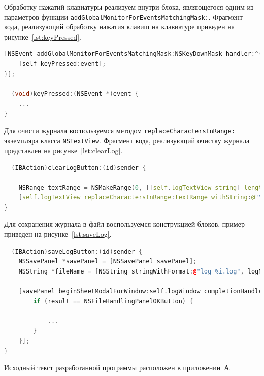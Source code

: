 Обработку нажатий клавиатуры реализуем внутри блока, являющегося одним из
параметров функции \texttt{addGlobalMonitorForEventsMatchingMask:}. Фрагмент кода,
реализующий обработку нажатия клавиш на клавиатуре приведен на рисунке~\ref{lst:keyPressed}.
\begin{lstlisting}[basicstyle=\scriptsize\ttfamily,
                   numberstyle=\scriptsize\ttfamily,
                   xleftmargin=7mm,
                   language=C++,caption={Фрагмент кода, реализующий обработку \\
                      нажатия клавиш на клавиатуре},
                   label=lst:keyPressed]
[NSEvent addGlobalMonitorForEventsMatchingMask:NSKeyDownMask handler:^(NSEvent *event) {
    [self keyPressed:event];
}];

- (void)keyPressed:(NSEvent *)event {
    ...
}
\end{lstlisting}

Для очисти журнала воспользуемся методом \texttt{replaceCharactersInRange:} экземпляра
класса \texttt{NSTextView}. Фрагмент кода, реализующий очистку журнала представлен
на рисунке~\ref{lst:clearLog}.
\begin{lstlisting}[basicstyle=\scriptsize\ttfamily,
                   numberstyle=\scriptsize\ttfamily,
                   xleftmargin=7mm,
                   language=C++,caption={Фрагмент кода, реализующий очистку журнала},
                   label=lst:clearLog]
- (IBAction)clearLogButton:(id)sender {

    NSRange textRange = NSMakeRange(0, [[self.logTextView string] length]);
    [self.logTextView replaceCharactersInRange:textRange withString:@""];
}
\end{lstlisting}

Для сохранения журнала в файл воспользуемся конструкцией блоков, пример приведен
на рисунке~\ref{lst:saveLog}.
\begin{lstlisting}[basicstyle=\scriptsize\ttfamily,
                   numberstyle=\scriptsize\ttfamily,
                   xleftmargin=7mm,
                   language=C++,caption={Использование блока для сохранения файла журнала},
                   label=lst:saveLog]
- (IBAction)saveLogButton:(id)sender {
    NSSavePanel *savePanel = [NSSavePanel savePanel];
    NSString *fileName = [NSString stringWithFormat:@"log_%i.log", logNumber];

    [savePanel beginSheetModalForWindow:self.logWindow completionHandler:^(NSInteger result) {
        if (result == NSFileHandlingPanelOKButton) {

            ...
        }
    }];
}
\end{lstlisting}

Исходный текст разработанной программы расположен в приложении~А.

\pagebreak
